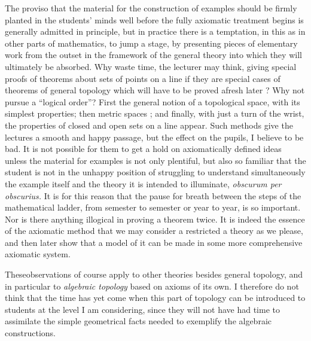 The proviso that the material for the construction of examples should
be firmly planted in the students' minds well before the fully
axiomatic treatment begins is generally admitted in principle, but in
practice there is a temptation, in this as in other parts of
mathematics, to jump a stage, by presenting pieces of elementary work
from the outset in the framework of the general theory into which they
will ultimately be absorbed. Why waste time, the lecturer may think,
giving special proofs of theorems about sets of points on a line if
they are special cases of theorems of general topology which will have
to be proved afresh later ? Why not pursue a ``logical order''? First
the general notion of a topological space, with its  simplest
properties; then metric spaces ; and finally, with just a turn of the
wrist, the properties of closed and open sets on a line appear. Such
methods give the lectures a smooth and happy passage, but the effect
on the pupils, I believe to be bad. It is not possible for them to get
a hold on axiomatically defined ideas  unless the material for
examples is not only plentiful, but also so familiar that the student
is not in the unhappy position of struggling to understand
simultaneously the example itself and the theory it is intended to
illuminate, \textit{obscurum per obscurius.} It is for this reason
that the pause for breath between the steps of the mathematical
ladder, from semester to semester or year to year, is so
important. Nor is there anything illogical in proving a theorem
twice. It is indeed the essence of the axiomatic method that we may
consider a restricted a theory as we please, and then later show that
a model of it can be made in some more comprehensive axiomatic system.

These\pageoriginale observations of course apply to other theories
besides general topology, and in particular to \textit{algebraic
  topology} based on axioms of its own. I therefore do not think that
the time has yet come when this part of topology can be introduced to
students at the level I am considering, since they will not have had
time to assimilate the simple geometrical facts needed to exemplify
the algebraic constructions. 

